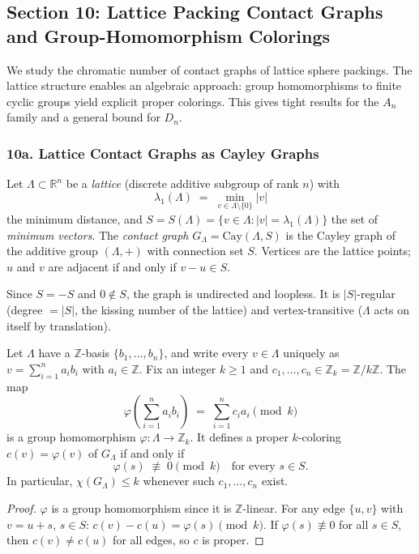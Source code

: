 \subsection*{Section 10: Lattice Packing Contact Graphs and Group-Homomorphism Colorings}

We study the chromatic number of contact graphs of lattice sphere packings.  The lattice structure enables an algebraic approach: group homomorphisms to finite cyclic groups yield explicit proper colorings.  This gives tight results for the $A_n$ family and a general bound for $D_n$.

\subsubsection*{10a. Lattice Contact Graphs as Cayley Graphs}

Let $\Lambda \subset \mathbb{R}^n$ be a \emph{lattice} (discrete additive subgroup of rank $n$) with
\[
  \lambda_1(\Lambda) \;=\; \min_{v \in \Lambda \setminus \{0\}} |v|
\]
the minimum distance, and $S = S(\Lambda) = \{v \in \Lambda : |v| = \lambda_1(\Lambda)\}$ the set of \emph{minimum vectors}.  The \emph{contact graph} $G_\Lambda = \mathrm{Cay}(\Lambda, S)$ is the Cayley graph of the additive group $(\Lambda, +)$ with connection set $S$.  Vertices are the lattice points; $u$ and $v$ are adjacent if and only if $v - u \in S$.

Since $S = -S$ and $0 \notin S$, the graph is undirected and loopless.  It is $|S|$-regular (degree $= |S|$, the kissing number of the lattice) and vertex-transitive ($\Lambda$ acts on itself by translation).

\begin{proposition}\label{prop:coloring-criterion}
Let $\Lambda$ have a $\mathbb{Z}$-basis $\{b_1, \ldots, b_n\}$, and write every $v \in \Lambda$ uniquely as $v = \sum_{i=1}^n a_i b_i$ with $a_i \in \mathbb{Z}$.  Fix an integer $k \ge 1$ and $c_1, \ldots, c_n \in \mathbb{Z}_k = \mathbb{Z}/k\mathbb{Z}$.  The map
\[
  \varphi\!\left(\sum_{i=1}^n a_i b_i\right) \;=\; \sum_{i=1}^n c_i a_i \pmod{k}
\]
is a group homomorphism $\varphi : \Lambda \to \mathbb{Z}_k$.  It defines a proper $k$-coloring $c(v) = \varphi(v)$ of $G_\Lambda$ if and only if
\[
  \varphi(s) \;\not\equiv\; 0 \pmod{k} \quad \text{for every } s \in S.
\]
In particular, $\chi(G_\Lambda) \le k$ whenever such $c_1, \ldots, c_n$ exist.
\end{proposition}

\begin{proof}
$\varphi$ is a group homomorphism since it is $\mathbb{Z}$-linear.  For any edge $\{u, v\}$ with $v = u + s$, $s \in S$: $c(v) - c(u) = \varphi(s) \pmod{k}$.  If $\varphi(s) \not\equiv 0$ for all $s \in S$, then $c(v) \neq c(u)$ for all edges, so $c$ is proper.
\end{proof}

